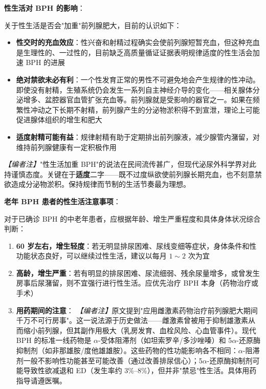 \begin{enumerate}
\vspace{0.5em}
\noindent\textbf{性生活对 BPH 的影响}：

关于性生活是否会"加重"前列腺肥大，目前的认识如下：

\begin{itemize}
	\item \textbf{性交时的充血效应}：性兴奋和射精过程确实会使前列腺短暂充血，但这种充血是生理性的、一过性的，目前缺乏高质量循证证据表明规律适度的性生活会加速 BPH 的进展
	\item \textbf{绝对禁欲未必有利}：一个性发育正常的男性不可避免地会产生规律的性冲动。即使没有射精，生殖系统仍会发生一系列自主神经介导的变化——相关腺体分泌增多、盆腔器官血管扩张充血等。前列腺就是受影响的器官之一。如果在频繁性冲动之下长期不射精，前列腺产生的分泌物淤积得不到宣泄，理论上可能促进腺体组织的增生和肥大
	\item \textbf{适度射精可能有益}：规律射精有助于定期排出前列腺液，减少腺管内潴留，对维持前列腺健康有一定积极作用
\end{itemize}

\noindent\textit{【编者注】}"性生活加重 BPH"的说法在民间流传甚广，但现代泌尿外科学界对此持谨慎态度。关键在于\textbf{适度}二字——既不过度纵欲使前列腺长期充血，也不刻意禁欲造成分泌物淤积。保持规律而节制的生活节奏最为理想。

\vspace{0.5em}
\noindent\textbf{老年 BPH 患者的性生活注意事项}：

对于已确诊 BPH 的中老年患者，应根据年龄、增生严重程度和具体身体状况综合判断：

\begin{enumerate}
	\item \textbf{60 岁左右，增生轻度}：若无明显排尿困难、尿线变细等症状，身体条件和性功能状态良好，可以继续过性生活，建议以每月 $1\sim2$ 次为宜

	\item \textbf{高龄，增生严重}：若有明显的排尿困难、尿流细弱、残余尿量增多，或曾发生房事后尿潴留，则不宜强行进行性生活。应优先治疗 BPH 本身（药物治疗或手术）

	\item \textbf{用药期间的注意}：
	\noindent\textit{【编者注】}原文提到"应用雌激素药物治疗前列腺肥大期间千万不可行房事"。这一说法源于历史做法——雌激素曾被用于抑制雄激素从而缩小前列腺，但其副作用极大（乳房发育、血栓风险、心血管事件）。现代 BPH 的标准一线药物是 $\alpha$-受体阻滞剂（如坦索罗辛/多沙唑嗪）和 5$\alpha$-还原酶抑制剂（如非那雄胺/度他雄雄胺）。这些药物的性功能影响各不相同：$\alpha$-阻滞剂一般不影响性功能甚至可能改善（通过改善排尿信心）；5$\alpha$-还原酶抑制剂可能导致性欲减退和 ED（发生率约 3\%--8\%），但并非"禁忌"性生活。具体用药指导请遵医嘱。
\end{enumerate}


\end{enumerate}
